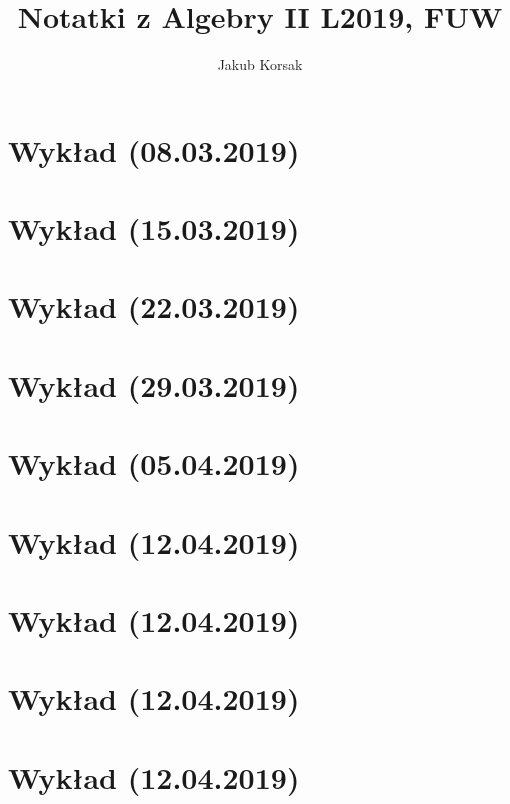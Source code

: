 \documentclass{article}
\title{Notatki z Algebry II L2019, FUW}
\author{Jakub Korsak}
\begin{document}
\maketitle

\pagebreak
\section{Wykład (08.03.2019)}

\pagebreak
\section{Wykład (15.03.2019)}

\pagebreak
\section{Wykład (22.03.2019)}

\pagebreak
\section{Wykład (29.03.2019)}

\pagebreak
\section{Wykład (05.04.2019)}

\pagebreak
\section{Wykład (12.04.2019)}

\pagebreak
\section{Wykład (12.04.2019)}

\pagebreak
\section{Wykład (12.04.2019)}

\pagebreak
\section{Wykład (12.04.2019)}

\end{document}
